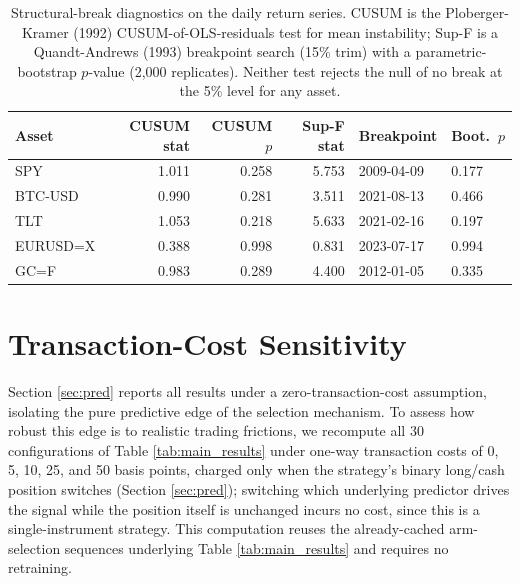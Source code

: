 \documentclass[pdflatex,sn-mathphys-num]{sn-jnl}
\theoremstyle{thmstyleone}%
\theoremstyle{thmstyletwo}%
\theoremstyle{thmstylethree}%
\begin{document}
\begin{appendices}
\begin{table}[htbp]
    \centering
    \caption{Structural-break diagnostics on the daily return series. CUSUM is the Ploberger-Kramer (1992) CUSUM-of-OLS-residuals test for mean instability; Sup-F is a Quandt-Andrews (1993) breakpoint search (15\% trim) with a parametric-bootstrap $p$-value (2,000 replicates). Neither test rejects the null of no break at the 5\% level for any asset.}
    \label{tab:structural-break}
    \setlength{\tabcolsep}{3pt}
    \scriptsize
    \begin{tabular}{@{} l rr rll @{}}
    \toprule
    \textbf{Asset} & CUSUM stat & CUSUM $p$ & Sup-F stat & Breakpoint & Boot.\ $p$ \\
    \midrule
    SPY & 1.011 & 0.258 & 5.753 & 2009-04-09 & 0.177 \\
    BTC-USD & 0.990 & 0.281 & 3.511 & 2021-08-13 & 0.466 \\
    TLT & 1.053 & 0.218 & 5.633 & 2021-02-16 & 0.197 \\
    EURUSD=X & 0.388 & 0.998 & 0.831 & 2023-07-17 & 0.994 \\
    GC=F & 0.983 & 0.289 & 4.400 & 2012-01-05 & 0.335 \\
    \bottomrule
    \end{tabular}
\end{table}

\section{Transaction-Cost Sensitivity}
\label{sec:fees}

Section \ref{sec:pred} reports all results under a zero-transaction-cost assumption, isolating the pure predictive edge of the selection mechanism. To assess how robust this edge is to realistic trading frictions, we recompute all 30 configurations of Table \ref{tab:main_results} under one-way transaction costs of 0, 5, 10, 25, and 50 basis points, charged only when the strategy's binary long/cash position switches (Section \ref{sec:pred}); switching which underlying predictor drives the signal while the position itself is unchanged incurs no cost, since this is a single-instrument strategy. This computation reuses the already-cached arm-selection sequences underlying Table \ref{tab:main_results} and requires no retraining.


\end{appendices}
\end{document}

